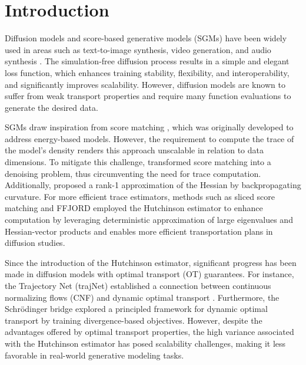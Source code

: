 \section{Introduction}


Diffusion models and score-based generative models (SGMs) \citep{DDPM, score_sde} have been widely used in areas such as text-to-image synthesis, video generation, and audio synthesis \citep{text_2_image, imagen_video, DiffWave}. The simulation-free diffusion process results in a simple and elegant loss function, which enhances training stability, flexibility, and interoperability, and significantly improves scalability. However, diffusion models are known to suffer from weak transport properties \citep{Lavenant_Santambrogio_22} and require many function evaluations to generate the desired data. 



SGMs draw inspiration from score matching \citep{score_matching}, which was originally developed to address energy-based models. However, the requirement to compute the trace of the model's density renders this approach unscalable in relation to data dimensions. To mitigate this challenge, \cite{Vincent_2011} transformed score matching into a denoising problem, thus circumventing the need for trace computation. Additionally, \cite{estimate_Hessian_curvature} proposed a rank-1 approximation of the Hessian by backpropagating curvature. For more efficient trace estimators, methods such as sliced score matching and FFJORD \citep{FFJORD, song2020sliced} employed the Hutchinson estimator \citep{Hutchinson89} to enhance computation by leveraging deterministic approximation of large eigenvalues and Hessian-vector products and enables more efficient transportation plans in diffusion studies.

Since the introduction of the Hutchinson estimator, significant progress has been made in diffusion models with optimal transport (OT) guarantees. For instance, the Trajectory Net (trajNet) \citep{TrajectoryNet} established a connection between continuous normalizing flows (CNF) \citep{neural_ode} and dynamic optimal transport \citep{Benamou_Brenier_2020}. Furthermore, the Schrödinger bridge \citep{forward_backward_SDE, mSB, SBP_max_llk, reflected_schrodinger_bridge, VSDM, VSMD} explored a principled framework for dynamic optimal transport \citep{DSB} by training divergence-based objectives. However, despite the advantages offered by optimal transport properties, the high variance associated with the Hutchinson estimator has posed scalability challenges, making it less favorable in real-world generative modeling tasks.

